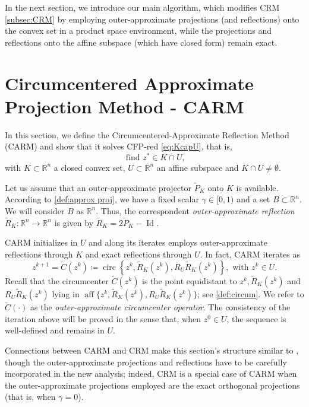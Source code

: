 \documentclass[smallextended,numbook,nospthms]{svjour3}
\theoremstyle{plain}
\theoremstyle{definition}
\def\RR{\mathds R}
\DeclareMathOperator{\Id}{Id}
\DeclareMathOperator{\aff}{aff}
\DeclareMathOperator{\circum}{circ}
\begin{document}
In the next section, we introduce our main algorithm, which modifies CRM \cref{subsec:CRM} by employing outer-approximate projections (and reflections) onto the convex set in a product space environment, while the projections and reflections onto the affine subspace (which have closed form) remain exact.

\newpage
\section{Circumcentered Approximate Projection Method - CARM}\label{sec:CARM}
In this section, we  define the Circumcentered-Approximate Reflection Method (CARM) and show that it solves CFP-red \cref{eq:KcapU}, that is,
\[
\text{ find } z^{*}\in K\cap U, 
\]
with $K \subset \RR^{n}$ a closed convex set, $U \subset \RR^{n}$ an affine subspace and $K \cap U \neq \emptyset$.

Let us assume that an outer-approximate projector $\tilde{P}_{K}$ onto $K$ is available. According to \cref{def:approx proj}, we have a fixed scalar $\gamma \in [0,1)$  and a set $B\subset \RR^{n}$. We will consider $B$ as $\RR^{n}$. Thus,  the correspondent \emph{outer-approximate reflection} $\tilde{R}_{K}: \RR^{n} \rightarrow \RR^{n}$ is given by $\tilde{R}_{K}=2 \tilde{P}_{K}-\Id$.

CARM initializes in $U$ and along its iterates employs outer-approximate reflections through $K$ and exact reflections through $U$. In fact, CARM iterates as
$$
z^{k+1}=\tilde{C}\left(z^{k}\right)\coloneqq \circum\left\{z^{k}, \tilde{R}_{K}\left(z^{k}\right), R_{U} \tilde{R}_{K}\left(z^{k}\right)\right\}, \text { with } z^{k} \in U.
$$
Recall that the circumcenter $\tilde{C}(z^{k})$ is the point equidistant to $z^{k}, \tilde{R}_{K}\left(z^{k}\right)$ and  $R_{U} \tilde{R}_{K}\left(z^{k}\right)$ lying in $\aff\{z^{k}, \tilde{R}_{K}\left(z^{k}\right), R_{U} \tilde{R}_{K}\left(z^{k}\right)\}$; see \cref{def:circum}. We refer to $\tilde{C}(\cdot)$ as the \emph{outer-approximate circumcenter operator}. The consistency of the iteration above will be proved in the sense that, when $z^{0}\in U$, the sequence is well-defined and remains in $U$. 

Connections between CARM and CRM make this section's structure similar to \cite[Section 2]{Behling:2020}, though the outer-approximate projections and reflections have to be carefully incorporated in the new analysis; indeed, CRM is a special case of CARM when the outer-approximate projections employed are the exact orthogonal projections (that is, when $\gamma = 0$).
\end{document}

